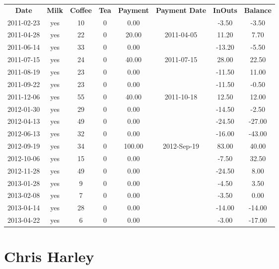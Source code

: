 \begin{center}
\begin{tabular}{cccccccc}
\textbf{Date} & \textbf{Milk} & \textbf{Coffee} & \textbf{Tea} & \textbf{Payment} & \textbf{Payment Date} & \textbf{InOuts} & \textbf{Balance} \\
2011-02-23 & yes & 10 & 0 &   0.00 &  &  -3.50 &  -3.50\\ 
2011-04-28 & yes & 22 & 0 &  20.00 & 2011-04-05 &  11.20 &   7.70\\ 
2011-06-14 & yes & 33 & 0 &   0.00 &  & -13.20 &  -5.50\\ 
2011-07-15 & yes & 24 & 0 &  40.00 & 2011-07-15 &  28.00 &  22.50\\ 
2011-08-19 & yes & 23 & 0 &   0.00 &  & -11.50 &  11.00\\ 
2011-09-22 & yes & 23 & 0 &   0.00 &  & -11.50 &  -0.50\\ 
2011-12-06 & yes & 55 & 0 &  40.00 & 2011-10-18 &  12.50 &  12.00\\ 
2012-01-30 & yes & 29 & 0 &   0.00 &  & -14.50 &  -2.50\\ 
2012-04-13 & yes & 49 & 0 &   0.00 &  & -24.50 & -27.00\\ 
2012-06-13 & yes & 32 & 0 &   0.00 &  & -16.00 & -43.00\\ 
2012-09-19 & yes & 34 & 0 & 100.00 & 2012-Sep-19 &  83.00 &  40.00\\ 
2012-10-06 & yes & 15 & 0 &   0.00 &  &  -7.50 &  32.50\\ 
2012-11-28 & yes & 49 & 0 &   0.00 &  & -24.50 &   8.00\\ 
2013-01-28 & yes &  9 & 0 &   0.00 &  &  -4.50 &   3.50\\ 
2013-02-08 & yes &  7 & 0 &   0.00 &  &  -3.50 &   0.00\\ 
2013-04-14 & yes & 28 & 0 &   0.00 &  & -14.00 & -14.00\\ 
2013-04-22 & yes &  6 & 0 &   0.00 &  &  -3.00 & -17.00
\end{tabular}
\end{center}

\section{Chris Harley}

